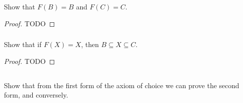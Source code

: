 \documentclass{report}
\begin{document}
  Show that $F(B) = B$ and $F(C) = C$.

  \begin{proof}
    TODO
  \end{proof}

\subsubsection{}%

  Show that if $F(X) = X$, then $B \subseteq X \subseteq C$.

  \begin{proof}
    TODO
  \end{proof}

\subsection{}%

  Show that from the first form of the axiom of choice we can prove the second
    form, and conversely.
\end{document}
